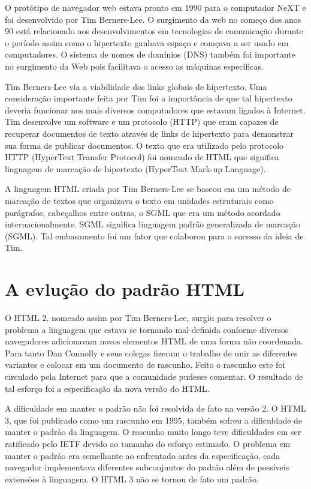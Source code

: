 O protótipo de navegador web estava pronto em 1990 para o computador NeXT e foi desenvolvido por Tim Berners-Lee. O surgimento da web no começo dos anos 90 está relacionado aos desenvolvimentos em tecnologias de comunicação durante o período assim como o hipertexto ganhava espaço e comçava a ser usado em computadores. O sistema de nomes de domínios (DNS) também foi importante no surgimento da Web pois facilitava o acesso as máquinas específicas.

Tim Berners-Lee via a viabilidade dos links globais de hipertexto. Uma consideração importante feita por Tim foi a importância de que tal hipertexto deveria funcionar nos mais diversos computadores que estavam ligados à Internet. Tim desenvolve um software e um protocolo (HTTP) que eram capazes de recuperar documentos de texto através de links de hipertexto para demonstrar sua forma de publicar documentos. O texto que era utilizado pelo protocolo HTTP (HyperText Transfer Protocol) foi nomeado de HTML que significa linguagem de marcação de hipertexto (HyperText Mark-up Language).

A linguagem HTML criada por Tim Berners-Lee se baseou em um método de marcação de textos que organizava o texto em unidades estruturais como parágrafos, cabeçalhos entre outras, o SGML que era um método acordado internacionalmente. SGML significa linguagem padrão generalizada de marcação (SGML). Tal embasamento foi um fator que colaborou para o sucesso da ideia de Tim. \cite{htmlHist}

\section{A evlução do padrão HTML}
O HTML 2, nomeado assim por Tim Berners-Lee, surgiu para resolver o problema a linguagem que estava se tornando mal-definida conforme diversos navegadores adicionavam novos elementos HTML de uma forma não coordenada. Para tanto Dan Connolly e seus colegas fizeram o trabalho de unir as diferentes variantes e colocar em um documento de rascunho. Feito o rascunho este foi circulado pela Internet para que a comunidade pudesse comentar. O resultado de tal esforço foi a especificação da nova versão do HTML.

A dificuldade em manter o padrão não foi resolvida de fato na versão 2. O HTML 3, que foi publicado como um rascunho em 1995, também sofreu a dificuldade de manter o padrão da linguagem. O rascunho muito longo teve dificuldades em ser ratificado pelo IETF devido ao tamanho do esforço estimado. O problema em manter o padrão era semelhante ao enfrentado antes da especificação, cada navegador implementava diferentes subconjuntos do padrão além de possíveis extensões à linguagem. O HTML 3 não se tornou de fato um padrão.

